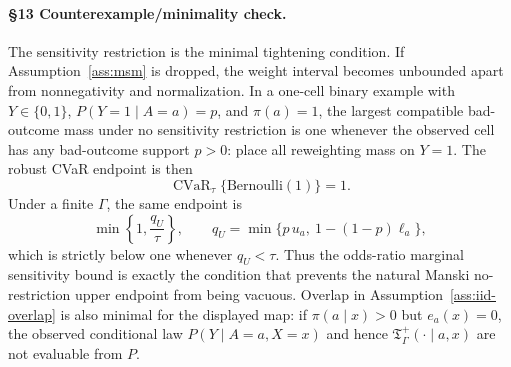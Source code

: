 \paragraph{\S13 Counterexample/minimality check.}
The sensitivity restriction is the minimal tightening condition.  If Assumption~\ref{ass:msm} is
dropped, the weight interval becomes unbounded apart from nonnegativity and normalization.  In a
one-cell binary example with \(Y\in\{0,1\}\), \(P(Y=1\mid A=a)=p\), and \(\pi(a)=1\), the largest
compatible bad-outcome mass under no sensitivity restriction is one whenever the observed cell has
any bad-outcome support \(p>0\): place all reweighting mass on \(Y=1\).  The robust CVaR endpoint is
then
\[
\operatorname{CVaR}_{\tau}\{\mathrm{Bernoulli}(1)\}=1.
\]
Under a finite \(\Gamma\), the same endpoint is
\[
\min\left\{1,\frac{q_U}{\tau}\right\},
\qquad
q_U=\min\{p\,u_a,\ 1-(1-p)\ell_a\},
\]
which is strictly below one whenever \(q_U<\tau\).  Thus the odds-ratio marginal sensitivity bound
is exactly the condition that prevents the natural Manski no-restriction upper endpoint from being
vacuous.  Overlap in Assumption~\ref{ass:iid-overlap} is also minimal for the displayed map: if
\(\pi(a\mid x)>0\) but \(e_a(x)=0\), the observed conditional law
\(P(Y\mid A=a,X=x)\) and hence \(\mathfrak T_\Gamma^+(\cdot\mid a,x)\) are not evaluable from \(P\).
